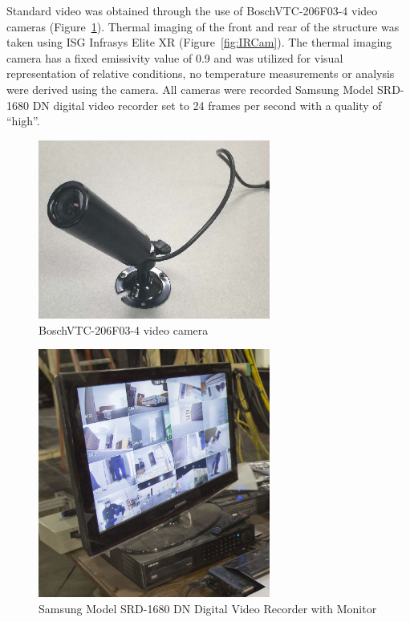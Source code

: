\documentclass[12pt,oneside]{book}
\begin{document}
Standard video was obtained through the use of BoschVTC-206F03-4 video cameras (Figure~\ref{fig:BullettCam}). Thermal imaging of the front and rear of the structure was taken using ISG Infrasys Elite XR (Figure~\ref{fig:IRCam}). The thermal imaging camera has a fixed emissivity value of 0.9 and was utilized for visual representation of relative conditions, no temperature measurements or analysis were derived using the camera. All cameras were recorded Samsung Model SRD-1680 DN digital video recorder set to 24 frames per second with a quality of ``high''.

\begin{figure} [H]
	\centering
	\includegraphics[width = 3in]{0_Images/Instrumentation/BullettCam.jpg}

	\caption{BoschVTC-206F03-4 video camera}
	\label{fig:BullettCam}
\end{figure}

\begin{figure} [H]
	\centering
	\includegraphics[width = 3in]{0_Images/Instrumentation/DVR.jpg}

	\caption{Samsung Model SRD-1680 DN Digital Video Recorder with Monitor}
	\label{fig:DVR}
\end{figure}
\end{document}
